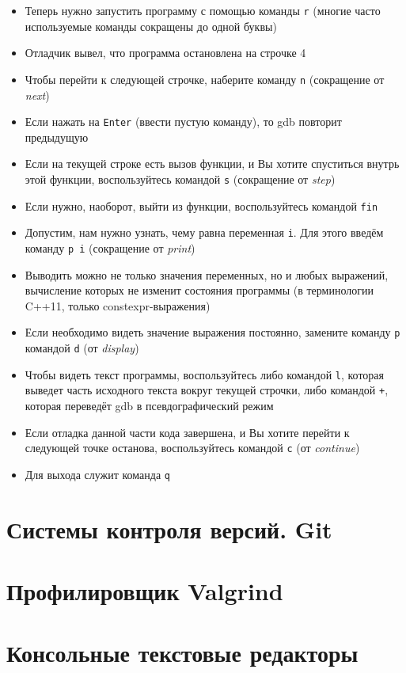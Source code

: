 \documentclass{beamer}
\begin{document}
\begin{frame}
	\begin{itemize}
		\item{Теперь нужно запустить программу с помощью команды \texttt{r} (многие часто используемые команды сокращены до одной буквы)}\pause
		\item{Отладчик вывел, что программа остановлена на строчке 4}\pause
		\item{Чтобы перейти к следующей строчке, наберите команду \texttt{n} (сокращение от \emph{next})}\pause
		\item{Если нажать на \texttt{Enter} (ввести пустую команду), то gdb повторит предыдущую}\pause
		\item{Если на текущей строке есть вызов функции, и Вы хотите спуститься внутрь этой функции, воспользуйтесь командой \texttt{s} (сокращение от \emph{step})}\pause
		\item{Если нужно, наоборот, выйти из функции, воспользуйтесь командой \texttt{fin}}
	\end{itemize}
\end{frame}

\begin{frame}
	\begin{itemize}
		\item{Допустим, нам нужно узнать, чему равна переменная \texttt{i}. Для этого введём команду \texttt{p i} (сокращение от \emph{print})}\pause
		\item{Выводить можно не только значения переменных, но и любых выражений, вычисление которых не изменит состояния программы (в терминологии C++11, только constexpr-выражения)}\pause
		\item{Если необходимо видеть значение выражения постоянно, замените команду \texttt{p} командой \texttt{d} (от \emph{display})}\pause
		\item{Чтобы видеть текст программы, воспользуйтесь либо командой \texttt{l}, которая выведет часть исходного текста вокруг текущей строчки, либо командой \texttt{+}, которая переведёт gdb в псевдографический режим}\pause
		\item{Если отладка данной части кода завершена, и Вы хотите перейти к следующей точке останова, воспользуйтесь командой \texttt{c} (от \emph{continue})}\pause
		\item{Для выхода служит команда \texttt{q}}
	\end{itemize}
\end{frame}

\section{Системы контроля версий. Git}
\begin{frame}
\end{frame}

\section{Профилировщик Valgrind}
\begin{frame}
\end{frame}

\section{Консольные текстовые редакторы}
\begin{frame}
\end{frame}
\end{document}
